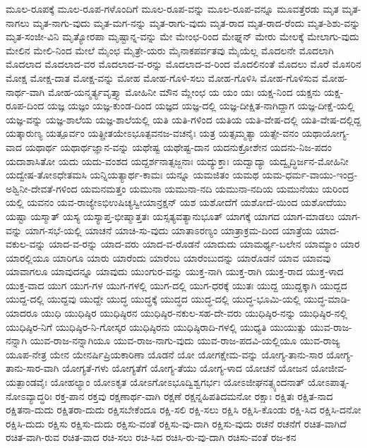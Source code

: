 ಮೂಲ-ರೂಪಕ್ಕೆ
ಮೂಲ-ರೂಪ-ಗಳೊಂದಿಗೆ
ಮೂಲ-ರೂಪ-ವನ್ನು
ಮೂಲ-ರೂಪ-ವನ್ನೂ
ಮೂವತ್ತೆರಡು
ಮೃತ
ಮೃತ-ನಾಗಲು
ಮೃತ-ನಾಗು-ವುದು
ಮೃತ-ಮಗ-ನನ್ನು
ಮೃತ-ರಾಗು-ವುದು
ಮೃತ-ರಾದ
ಮೃತ-ರಾದ-ರೆಂದು
ಮೃತ-ಶಿಶು-ವನ್ನು
ಮೃತ-ಸಂಜೀ-ವಿನಿ
ಮೃತ್ಯೋರಪಾ
ಮೃಷ್ಟಾನ್ನ-ವನ್ನು
ಮೇ
ಮೇಂಛ-ರಿಂದ
ಮೇಘ್ನನ್
ಮೇರು
ಮೇಲಕ್ಕೆ
ಮೇಲಾಗು-ವುದು
ಮೇಲಿನ
ಮೇಲಿ-ನಿಂದ
ಮೇಲೆ
ಮೈಂಛ
ಮೈತ್ರೇ-ಯರು
ಮೈನಾಕಪರ್ವತವು
ಮೈಯೆಲ್ಲ
ಮೊದಲನೇ
ಮೊದಲಾಗಿ
ಮೊದಲಾದ
ಮೊದಲಾದ-ವರ
ಮೊದಲಾದ-ವ-ರನ್ನು
ಮೊದಲಾದ-ವ-ರಿಂದ
ಮೊದಲಿನಂತೆ
ಮೊದಲು
ಮೊರೆ
ಮೊಸರಿನ
ಮೋಕ್ಷ
ಮೋಕ್ಷ-ದಾತ
ಮೋಕ್ಷ-ವನ್ನು
ಮೋಹ
ಮೋಹ-ಗೊಳಿ-ಸಲು
ಮೋಹ-ಗೊಳಿಸಿ
ಮೋಹ-ಗೊಳಿಸುವ
ಮೋಹ-ನಾರ್ಥ-ವಾಗಿ
ಮೋಹ-ಯನ್ಮರ್ತ್ಯವೃತ್ತ್ಯಾ
ಮೋಹಿನೀ
ಮೌನ
ಮ್ಲೇಂಛ
ಯ
ಯಂ
ಯಃ
ಯಕ್ಷ-ನಿಂದ
ಯಕ್ಷನು
ಯಕ್ಷ-ರೂಪ-ದಿಂದ
ಯಜ್ಞ
ಯಜ್ಞಂ
ಯಜ್ಞ-ಕುಂಡ-ದಿಂದ
ಯಜ್ಞದ
ಯಜ್ಞ-ದಲ್ಲಿ
ಯಜ್ಞ-ದೀಕ್ಷಿತ-ನಾಗಿದ್ದಾಗ
ಯಜ್ಞ-ದೀಕ್ಷೆ-ಯಲ್ಲಿ
ಯಜ್ಞ-ವನ್ನು
ಯಜ್ಞ-ಶಾಲೆಯ
ಯಜ್ಞ-ಶಾಲೆಯಲ್ಲಿ
ಯತಿ
ಯತಿ-ಗಳಿಂದ
ಯತಿಯ
ಯತಿ-ವೇಷ-ದಲ್ಲಿ
ಯತಿ-ವೇಷ-ದಲ್ಲಿದ್ದ
ಯತ್ಕಾರುಣ್ಯ
ಯತ್ಪೂರ್ವಂ
ಯತ್ಪ್ರೀತಯೇಽಭೂತ್ಪವನಜ-ವಚನೈಃ
ಯತ್ರ
ಯತ್ಸಮ್ಮತ್ಯಾ
ಯತ್ಸೇ-ವನಂ
ಯಥಾಯೋಗ್ಯ-ವಾದ
ಯಥಾರ್ಥ
ಯಥಾರ್ಥಜ್ಞಾನ-ವನ್ನು
ಯಥೇಷ್ಟ
ಯಥೇಷ್ಟ-ದಾನ
ಯದನುಕ್ರೋಶೇನ
ಯದನು-ನಿಜ-ಪದಂ
ಯದಾಶಾಸಿತೋ
ಯದು
ಯದು-ವಂಶದ
ಯದ್ದರ್ಶನಾತ್ಸಜ್ಜನಾಃ
ಯದ್ಯುಕ್ತಾಃ
ಯದ್ವಾದ್ಯಾ
ಯದ್ವೃದ್ಧಿರ್ಜನ-ಮೋಹಿನೀ
ಯದ್ವೇಷ-ತೋಽಧೇತಮಸಿ
ಯನ್ನಿಯತ್ಯಾರ್ಥ-ಕಾಮಃ
ಯನ್ನೂ
ಯಮಜಿತಂ
ಯಮಥ
ಯಮ-ಧರ್ಮ-ವಾಯು-ಇಂದ್ರ-ಅಶ್ವಿನೀ-ದೇವತೆ-ಗಳಿಂದ
ಯಮನಮತ್ತಂ
ಯಮುನಾ
ಯಮುನಾ-ನದಿ
ಯಮುನಾ-ನದಿಯ
ಯಮುನೆಯು
ಯರಿಂದ
ಯಲ್ಲಿ
ಯವನಂ
ಯವ-ರಾಜ್ಯೇಽಭಿಉಷಿಚ್ಯಸ್ವೀಯಾನ್ರಕ್ಷನ್
ಯಶ
ಯಶೋದೆಗೆ
ಯಶೋದೆ-ಯಿಂದ
ಯಶೋದೆಯು
ಯಷ್ಟಾ
ಯಸ್ಮಾತ್
ಯಸ್ಯ
ಯಸ್ಯಾಪ್ತ-ಭೀಷ್ಮಾತ್ತತಃ
ಯಸ್ಸತ್ಯವತ್ಯಾನುಭೂತ್
ಯಾಗಕ್ಕೆ
ಯಾಗದ
ಯಾಗ-ಮಾಡಲು
ಯಾಗ-ವನ್ನು
ಯಾಗ-ಸಭೆ-ಯಲ್ಲಿ
ಯಾಚನೆ
ಯಾಚಿ-ಸು-ವುದು
ಯಾತಾಽರಣ್ಯಂ
ಯಾತ್ರಾಕ್ರಮ-ದಿಂದ
ಯಾತ್ರೆಯ
ಯಾದ-ವಕುಲ-ವನ್ನು
ಯಾದ-ವ-ರನ್ನು
ಯಾದ-ವರು
ಯಾದ-ವ-ರೊಡನೆ
ಯಾದುದು
ಯಾಮರ್ಥ್ಯ-ಬಲೇನ
ಯಾಮ್ಯಾಂ
ಯಾರ
ಯಾರಲ್ಲಿಯೂ
ಯಾರಿಗೂ
ಯಾರು
ಯಾರೆಂದು
ಯಾರೆಂಬ
ಯಾರೆಂಬುದನ್ನು
ಯಾರೊಡನೆ
ಯಾವ
ಯಾವವು
ಯಾವಾಗಲೂ
ಯಾವುದನ್ನೂ
ಯಾವುದು
ಯುಂಗುರ-ವನ್ನು
ಯುಕ್ತ-ನಾಗಿ
ಯುಕ್ತ-ರಾಗಿ
ಯುಕ್ತ-ರಾದ
ಯುಕ್ತ-ಳಾದ
ಯುಕ್ತ-ವಾದ
ಯುಗ
ಯುಗ-ಗಳ
ಯುಗ-ಗಳಲ್ಲಿ
ಯುಗ-ದಲ್ಲಿ
ಯುಗ-ಧರಕ್ಕೆ
ಯುತಃ
ಯುದ್ದ
ಯುದ್ದಕ್ಕಾಗಿ
ಯುದ್ದದ
ಯುದ್ದ-ದಲ್ಲಿ
ಯುದ್ದವು
ಯುದ್ದೇ
ಯುದ್ಧ
ಯುದ್ಧಕ್ಕೆ
ಯುದ್ಧದ
ಯುದ್ಧ-ದಲ್ಲಿ
ಯುದ್ಧ-ಭೂಮಿ-ಯಲ್ಲಿ
ಯುದ್ಧ-ಮಾಡಿ-ಯಾದರೂ
ಯುಧಿ
ಯುಧಿಷ್ಠಿರ
ಯುಧಿಷ್ಠಿರನ
ಯುಧಿಷ್ಠಿರ-ನಕುಲ-ಸಹ-ದೇ-ವರು
ಯುಧಿಷ್ಠಿರ-ನನ್ನು
ಯುಧಿಷ್ಠಿರ-ನಲ್ಲಿ
ಯುಧಿಷ್ಠಿರ-ನಿಗೆ
ಯುಧಿಷ್ಠಿರ-ನಿ-ಗೋಸ್ಕರ
ಯುಧಿಷ್ಠಿರನು
ಯುಧಿಷ್ಠಿರಾದಿ-ಗಳಲ್ಲಿ
ಯುಧ್ಯತಿ
ಯುಯುತ್ಸು
ಯುವ-ರಾಜ-ನನ್ನಾಗಿ
ಯುವ-ರಾಜ-ನನ್ನಾಗಿಯೂ
ಯುವ-ರಾಜ-ನಾಗು-ವುದು
ಯುವ-ರಾಜ-ಪದವಿ-ಯಲ್ಲಿಯೂ
ಯುವ-ರಾಜ್ಯ
ಯೂಪ-ನೇತ್ರ
ಯೇನ
ಯೇನರ್ಷಿಪ್ರಿಯಕಾರಿಣಾ
ಯೊಡನೆ
ಯೋ
ಯೋಗಕ್ಷೇಮ-ವನ್ನು
ಯೋಗ್ಯ-ತಾನು-ಸಾರ
ಯೋಗ್ಯ-ತಾನು-ಸಾರ-ವಾಗಿ
ಯೋಗ್ಯತೆ-ಗಳು
ಯೋಗ್ಯತೆಗೆ
ಯೋಗ್ಯ-ತೆಯು
ಯೋಗ್ಯ-ಳಾದ
ಯೋಚನೆ
ಯೋಜನ
ಯೋಜೀವ-ಯತ್ಪಾಂಡವೈಃ
ಯೋಹಲ್ಯಾಂ
ಯೋಽಕೃತ
ಯೋಽಗೋಽಭೂದ್ವಿಶ್ವಗರ್ಭಃ
ಯೋಽಜೀಘನತ್ಸ್ಯಂದನಾತ್
ಯೋಽಪಾತ್ಸ-ನೋಽವ್ಯಾದ್ಧರಿಃ
ರಕ್ತ-ಪಾನ
ರಕ್ತವು
ರಕ್ಷಣಾರ್ಥ-ವಾಗಿ
ರಕ್ಷಣೆ
ರಕ್ಷನ್ನಹಿಪತಿದಮನೋ
ರಕ್ಷಾಃ
ರಕ್ಷಿತಃ
ರಕ್ಷಿತ-ನಾದ
ರಕ್ಷಿತನಾ-ದುದು
ರಕ್ಷಿತರಾ-ದುದು
ರಕ್ಷಿಸಬೇಕೆಂದೂ
ರಕ್ಷಿ-ಸಲಿ
ರಕ್ಷಿ-ಸಲು
ರಕ್ಷಿಸಿ
ರಕ್ಷಿಸಿ-ಕೊಂಡು
ರಕ್ಷಿ-ಸಿದ
ರಕ್ಷಿಸಿ-ದನೋ
ರಕ್ಷಿಸಿ-ದುದು
ರಕ್ಷಿಸು
ರಕ್ಷಿಸು-ದುದು
ರಕ್ಷಿಸು-ವಂತೆ
ರಕ್ಷಿಸು-ವು-ದಾಗಿ
ರಕ್ಷಿಸು-ವುದು
ರಚನೆ
ರಚನೆಗೆ
ರಚಿತ-ವಾಗಿದೆ
ರಚಿತ-ವಾಗಿ-ರುವ
ರಚಿತ-ವಾದ
ರಚಿ-ಸಲು
ರಚಿ-ಸಿದ
ರಚಿಸಿ-ರು-ವು-ದಾಗಿ
ರಚಿಸು-ವಂತೆ
ರಜ-ಕನ
